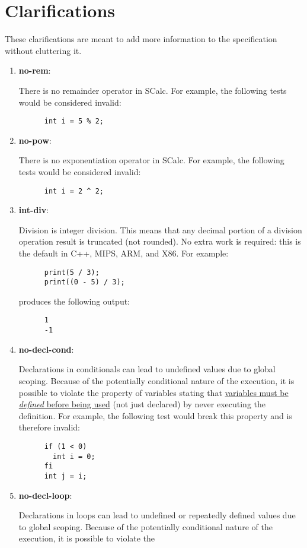 \documentclass{article}
\newcommand{\clarificationdest}[1]{\hypertarget{#1}{\textbf{#1}:}}
\begin{document}
\section{Clarifications}
These clarifications are meant to add more information to the specification without cluttering it.
\begin{enumerate}
  \item
    \clarificationdest{no-rem}
    There is no remainder operator in SCalc. For example, the following tests would be considered
    invalid:
    \begin{lstlisting}
      int i = 5 % 2;
    \end{lstlisting}
  \item
    \clarificationdest{no-pow}
    There is no exponentiation operator in SCalc. For example, the following tests would be
    considered invalid:
    \begin{lstlisting}
      int i = 2 ^ 2;
    \end{lstlisting}
  \item
    \clarificationdest{int-div}
    Division is integer division. This means that any decimal portion of a division operation
    result is truncated (not rounded). No extra work is required: this is the default in C++, MIPS,
    ARM, and X86. For example:
    \begin{lstlisting}
      print(5 / 3);
      print((0 - 5) / 3);
    \end{lstlisting}
    produces the following output:
    \begin{lstlisting}
      1
      -1
    \end{lstlisting}
  \item
    \clarificationdest{no-decl-cond}
    Declarations in conditionals can lead to undefined values due to global scoping.  Because of
    the potentially conditional nature of the execution, it is possible to violate the property of
    variables stating that \hyperlink{variable-props}{variables must be \textit{defined} before
    being used} (not just declared) by never executing the definition. For example, the following
    test would break this property and is therefore invalid:
    \begin{lstlisting}
      if (1 < 0)
        int i = 0;
      fi
      int j = i;
    \end{lstlisting}
  \item
    \clarificationdest{no-decl-loop}
    Declarations in loops can lead to undefined or repeatedly defined values due to global scoping.
    Because of the potentially conditional nature of the execution, it is possible to violate the

\end{enumerate}
\end{document}
